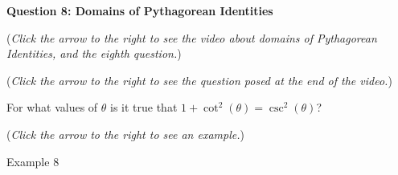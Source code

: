 \documentclass{ximera}
\begin{document}
\textbf{Question 8: Domains of Pythagorean Identities}
\begin{question}
\begin{flushright}
{\color{blue}(\emph{Click the arrow to the right to see the
video 
about domains of Pythagorean Identities, and the eighth question.})}
\end{flushright}
\begin{center}
\begin{expandable}
{\color{blue}(\emph{Click the arrow to the right to see the question
posed at the end of the video.})}
\begin{expandable}
For what values of $\theta$ is it true that $1 + \cot^2(\theta) = \csc^2(\theta)$?

\begin{multipleChoice}
\end{multipleChoice}
\begin{flushright}
{\color{blue}(\emph{Click the arrow to the right to see an example.})}
\end{flushright}
\begin{expandable}
Example 8
\end{expandable}
\end{expandable}
\end{expandable}
\end{center}
\end{question}
\end{document}
